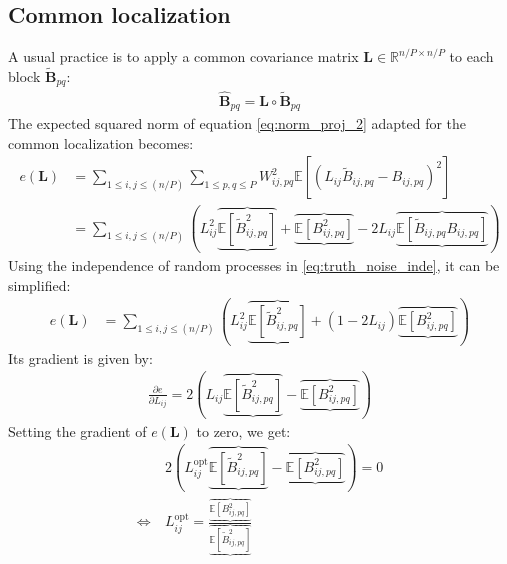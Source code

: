 \documentclass[12pt]{scrartcl}
\begin{document}
\subsection{Common localization}
A usual practice is to apply a common covariance matrix $\mathbf{L} \in \mathbb{R}^{n/P \times n/P}$ to each block $\widetilde{\mathbf{B}}_{pq}$:
\begin{align}
\widehat{\mathbf{B}}_{pq} = \mathbf{L} \circ \widetilde{\mathbf{B}}_{pq}
\end{align}
The expected squared norm of equation \eqref{eq:norm_proj_2} adapted for the common localization becomes:
\begin{align}
e(\mathbf{L}) & = \sum_{1 \le i,j \le (n/P)} \sum_{1 \le p,q \le P} W_{ij,pq}^2 \mathbb{E}\left[ \left(L_{ij} \widetilde{B}_{ij,pq} - B_{ij,pq} \right)^2 \right] \nonumber \\
& = \sum_{1 \le i,j \le (n/P)} \left(L^2_{ij} \underbrace{\overbrace{\mathbb{E} \left[\widetilde{B}_{ij,pq}^2\right]}} + \underbrace{\overbrace{\mathbb{E} \left[B^2_{ij,pq}\right]}} - 2 L_{ij} \underbrace{\overbrace{\mathbb{E} \left[\widetilde{B}_{ij,pq} B_{ij,pq}\right]}} \right)
\end{align}
Using the independence of random processes in \eqref{eq:truth_noise_inde}, it can be simplified:
\begin{align}
e(\mathbf{L}) & = \sum_{1 \le i,j \le (n/P)} \left(L^2_{ij} \underbrace{\overbrace{\mathbb{E} \left[\widetilde{B}_{ij,pq}^2\right]}} + \left(1 - 2 L_{ij}\right) \underbrace{\overbrace{\mathbb{E} \left[B^2_{ij,pq}\right]}} \right)
\end{align}
Its gradient is given by:
\begin{align}
\frac{\partial e}{\partial L_{ij}} = 2 \left(L_{ij} \underbrace{\overbrace{\mathbb{E} \left[\widetilde{B}_{ij,pq}^2\right]}} - \underbrace{\overbrace{\mathbb{E} \left[B^2_{ij,pq}\right]}} \right)
\end{align}
Setting the gradient of $e(\mathbf{L})$ to zero, we get:
\begin{align}
\label{eq:loc_th_com}
& 2 \left(L^\mathrm{opt}_{ij} \underbrace{\overbrace{\mathbb{E} \left[\widetilde{B}_{ij,pq}^2\right]}} - \underbrace{\overbrace{\mathbb{E} \left[B^2_{ij,pq}\right]}}\right) = 0 \nonumber \\
\Leftrightarrow \ & L^\mathrm{opt}_{ij} = \frac{\displaystyle \underbrace{\overbrace{\mathbb{E} \left[B^2_{ij,pq}\right]}}}{\displaystyle \underbrace{\overbrace{\mathbb{E} \left[\widetilde{B}_{ij,pq}^2\right]}}}
\end{align}
\end{document}
